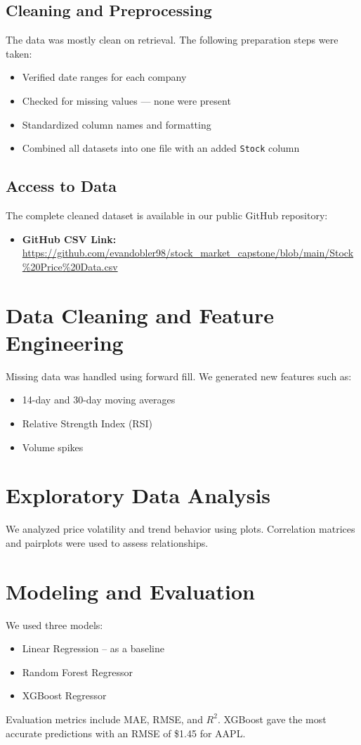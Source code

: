 \documentclass[runningheads]{llncs}
\begin{document}
\subsection{Cleaning and Preprocessing}
The data was mostly clean on retrieval. The following preparation steps were taken:
\begin{itemize}
    \item Verified date ranges for each company
    \item Checked for missing values — none were present
    \item Standardized column names and formatting
    \item Combined all datasets into one file with an added \texttt{Stock} column
\end{itemize}

\subsection{Access to Data}
The complete cleaned dataset is available in our public GitHub repository:
\begin{itemize}
    \item \textbf{GitHub CSV Link:} \url{https://github.com/evandobler98/stock_market_capstone/blob/main/Stock%20Price%20Data.csv}
\end{itemize}

\section{Data Cleaning and Feature Engineering}
Missing data was handled using forward fill. We generated new features such as:
\begin{itemize}
    \item 14-day and 30-day moving averages
    \item Relative Strength Index (RSI)
    \item Volume spikes
\end{itemize}

\section{Exploratory Data Analysis}
We analyzed price volatility and trend behavior using plots. Correlation matrices and pairplots were used to assess relationships.

\section{Modeling and Evaluation}
We used three models:
\begin{itemize}
    \item Linear Regression – as a baseline
    \item Random Forest Regressor
    \item XGBoost Regressor
\end{itemize}
Evaluation metrics include MAE, RMSE, and $R^2$. XGBoost gave the most accurate predictions with an RMSE of \$1.45 for AAPL.
\end{document}
